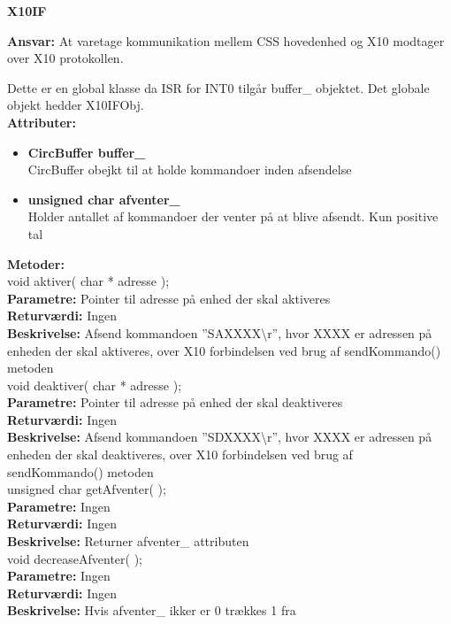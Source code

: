 %
%
{\centering
\textbf{X10IF}\par
}
\textbf{Ansvar:} At varetage kommunikation mellem CSS hovedenhed og X10 modtager over X10 protokollen.

Dette er en global klasse da ISR for INT0 tilgår buffer\_ objektet. Det globale objekt hedder X10IFObj. \\
\textbf{Attributer:}
\begin{itemize}
	\item \textbf{CircBuffer buffer\_} \\
	CircBuffer obejkt til at holde kommandoer inden afsendelse
	\item \textbf{unsigned char afventer\_} \\
	Holder antallet af kommandoer der venter på at blive afsendt. Kun positive tal
\end{itemize}
\textbf{Metoder:} \\
void aktiver( char * adresse ); \\
\textbf{Parametre:} Pointer til adresse på enhed der skal aktiveres \\
\textbf{Returværdi:} Ingen \\
\textbf{Beskrivelse:} Afsend kommandoen ''SAXXXX\textbackslash r'', hvor XXXX er adressen på enheden der skal aktiveres, over X10 forbindelsen ved brug af sendKommando() metoden \\

void deaktiver( char * adresse ); \\
\textbf{Parametre:} Pointer til adresse på enhed der skal deaktiveres \\
\textbf{Returværdi:} Ingen \\
\textbf{Beskrivelse:} Afsend kommandoen ''SDXXXX\textbackslash r'', hvor XXXX er adressen på enheden der skal deaktiveres, over X10 forbindelsen ved brug af sendKommando() metoden \\

unsigned char getAfventer( ); \\
\textbf{Parametre:} Ingen \\
\textbf{Returværdi:} Ingen \\
\textbf{Beskrivelse:} Returner afventer\_ attributen \\

void decreaseAfventer( ); \\
\textbf{Parametre:} Ingen \\
\textbf{Returværdi:} Ingen \\
\textbf{Beskrivelse:} Hvis afventer\_ ikker er 0 trækkes 1 fra \\

